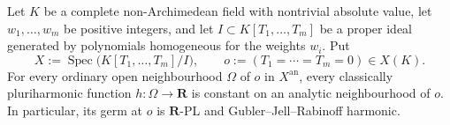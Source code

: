\begin{theorem}
\label{thm:p061-positive-weighted-cone-vertex-constancy}
Let \(K\) be a complete non-Archimedean field with nontrivial absolute
value, let \(w_1,\ldots,w_m\) be positive integers, and let
\(I\subset K[T_1,\ldots,T_m]\) be a proper ideal generated by
polynomials homogeneous for the weights \(w_i\).  Put
\[
 X:=\operatorname{Spec}\bigl(K[T_1,\ldots,T_m]/I\bigr),
 \qquad o:=(T_1=\cdots=T_m=0)\in X(K).
\]
For every ordinary open neighbourhood \(\Omega\) of \(o\) in
\(X^{\mathrm{an}}\), every classically pluriharmonic function
\(h:\Omega\to\mathbf R\) is constant on an analytic neighbourhood of
\(o\).  In particular, its germ at \(o\) is \(\mathbf R\)-PL and
Gubler--Jell--Rabinoff harmonic.
\end{theorem}
